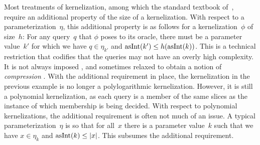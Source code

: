 Most treatments of kernelization, among which the standard textbook of~\textcite{fomin2019kernelization}, require an additional property of the size of a kernelization.
With respect to a parameterization~$\eta$, this additional property is as follows for a kernelization~$\phi$ of size~$h$:
For any query~$q$ that $\phi$ poses to its oracle, there must be a parameter value~$k'$ for which we have $q \in \eta_{k'}$ and $\operatorname{asInt}(k') \le h(\operatorname{asInt}(k))$.
This is a technical restriction that codifies that the queries may not have an overly high complexity.
It is not always imposed \parencite[e.g.][]{flum2006parameterized}, and sometimes relaxed to obtain a notion of \emph{compression} \parencite{bodlaender2014kernelization}.
With the additional requirement in place, the kernelization in the previous example is no longer a polylogarithmic kernelization.
However, it is still a polynomial kernelization, as each query is a member of the same slices as the instance of which membership is being decided.
With respect to polynomial kernelizations, the additional requirement is often not much of an issue.
A typical parameterization~$\eta$ is so that for all~$x$ there is a parameter value~$k$ such that we have $x \in \eta_k$ and $\operatorname{asInt}(k) \le {\lvert x\rvert}$.
This subsumes the additional requirement.

